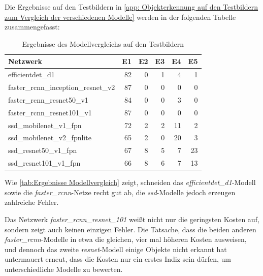 \documentclass[12pt, oneside]{article}
\begin{document}
Die Ergebnisse auf den Testbildern in \autoref{app: Objekterkennung auf den Testbildern zum Vergleich der verschiedenen Modelle} werden in der folgenden Tabelle zusammengefasst:
\begin{table}[ht]
	\centering
	\caption{Ergebnisse des Modellvergleichs auf den Testbildern}
	\label{tab:Ergebnisse Modellvergleich}
	\begin{tabular}{|l|r|r|r|r|r|}
		\hline
		\textbf{Netzwerk}                   & \textbf{E1} & \textbf{E2} & \textbf{E3} & \textbf{E4} & \textbf{E5} \\ \hline
		efficientdet\_d1                    & 82          & 0           & 1           & 4           & 1           \\ \hline
		faster\_rcnn\_inception\_resnet\_v2 & 87          & 0           & 0           & 0           & 0           \\ \hline
		faster\_rcnn\_resnet50\_v1          & 84          & 0           & 0           & 3           & 0           \\ \hline
		faster\_rcnn\_resnet101\_v1         & 87          & 0           & 0           & 0           & 0           \\ \hline
		ssd\_mobilenet\_v1\_fpn             & 72          & 2           & 2           & 11          & 2           \\ \hline
		ssd\_mobilenet\_v2\_fpnlite         & 65          & 2           & 0           & 20          & 3           \\ \hline
		ssd\_resnet50\_v1\_fpn              & 67          & 8           & 5           & 7           & 23          \\ \hline
		ssd\_resnet101\_v1\_fpn             & 66          & 8           & 6           & 7           & 13          \\ \hline
	\end{tabular}
\end{table}
Wie \autoref{tab:Ergebnisse Modellvergleich} zeigt, schneiden das \textit{efficientdet\_d1}-Modell sowie die \textit{faster\_rcnn}-Netze recht gut ab, die \textit{ssd}-Modelle jedoch erzeugen zahlreiche Fehler.

Das Netzwerk \textit{faster\_rcnn\_resnet\_101} weißt nicht nur die geringsten Kosten auf, sondern zeigt auch keinen einzigen Fehler. Die Tatsache, dass die beiden anderen \textit{faster\_rcnn}-Modelle in etwa die gleichen, vier mal höheren Kosten ausweisen, und dennoch das zweite \textit{resnet}-Modell einige Objekte nicht erkannt hat untermauert erneut, dass die Kosten nur ein erstes Indiz sein dürfen, um unterschiedliche Modelle zu bewerten.\\
\end{document}
